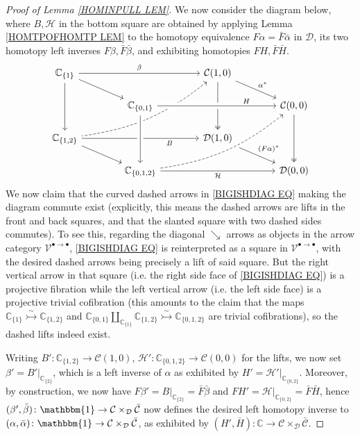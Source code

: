 \documentclass[a4paper,10pt
 ,final
]{article}%
\numberwithin{equation}{section}
\numberwithin{figure}{section}
\theoremstyle{definition} %
\newcommand{\V}{\ensuremath{\mathcal V}}
\newcommand{\1}{\ensuremath{\mathbbm 1}}%
\begin{document}
\begin{proof}[Proof of Lemma \ref{HOMINPULL LEM}]
	We now consider the diagram below, 
	where $B, \mathcal{H}$ in the bottom square
	are obtained by applying Lemma \ref{HOMTPOFHOMTP LEM}
	to the homotopy equivalence 
	$F\alpha = \bar{F} \bar{\alpha}$ in $\mathcal{D}$,
	its two homotopy left inverses
	$F\beta, \bar{F} \bar{\beta}$,
	and exhibiting homotopies
	$F H, \bar{F} \bar{H}$.
	\begin{equation}\label{BIGISHDIAG EQ}
	\begin{tikzcd}[row sep = 15pt,column sep = 40pt]
	\mathbb{C}_{\{1\}} 	\ar{rr}{\beta} \ar{rd} \ar{dd}&&
	\mathcal{C}(1,0) \ar[twoheadrightarrow]{dd} \ar{dr}{\alpha^{\**}}
	\ar[dashed,leftarrow,bend left =15]{ddll}
	\\
	&
	\mathbb{C}_{\{0,1\}} \arrow[crossing over]{rr}[near end]{H} &&
	\mathcal{C}(0,0)  
	\ar[twoheadrightarrow]{dd}
	\\
	\mathbb{C}_{\{1,2\}} \ar{rr}[swap,near end]{B} \ar{rd} &&
	\mathcal{D}(1,0) \ar{rd}{(F\alpha)^{\**}}
	\\
	&
	\mathbb{C}_{\{0,1,2\}}
	\ar[dashed,bend right =15,crossing over]{uurr}
	\ar{rr}[swap]{\mathcal{H}} \arrow[uu, leftarrow, crossing over] &&
	\mathcal{D}(0,0)
	\end{tikzcd}
	\end{equation}
	We now claim that the curved dashed arrows in 
	\eqref{BIGISHDIAG EQ}
	making the diagram commute exist
	(explicitly, this means the dashed arrows are lifts in the front and back squares, and that the slanted square with two dashed sides commutes).
	To see this, regarding the diagonal $\searrow$ arrows as objects in the arrow category $\V^{\bullet \to \bullet}$, 
	\eqref{BIGISHDIAG EQ}
	is reinterpreted as a square in $\V^{\bullet \to \bullet}$,
	with the desired dashed arrows being precisely a lift of said square.
	But the right vertical arrow in that square
	(i.e. the right side face of \eqref{BIGISHDIAG EQ}) is a projective fibration 
	while the left vertical arrow 
	(i.e. the left side face)
	is a projective trivial cofibration
	(this amounts to the claim that the maps
	$\mathbb{C}_{\{1\}} \overset{\sim}{\rightarrowtail} \mathbb{C}_{\{1,2\}}$ and
	$\mathbb{C}_{\{0,1\}} \amalg_{\mathbb{C}_{\{1\}}} \mathbb{C}_{\{1,2\}} \overset{\sim}{\rightarrowtail} \mathbb{C}_{\{0,1,2\}}$
	are trivial cofibrations),
	so the dashed lifts indeed exist.
	
	Writing 
	$B'\colon \mathbb{C}_{\{1,2\}} \to \mathcal{C}(1,0)$,
	$\mathcal{H}' \colon \mathbb{C}_{\{0,1,2\}} \to \mathcal{C}(0,0)$
	for the lifts,
	we now set
	$\beta' = B'|_{\mathbb{C}_{\{2\}}}$,
	which is a left inverse of $\alpha$
	as exhibited by $H' = \mathcal{H}'|_{\mathbb{C}_{\{0,2\}}}$.
	Moreover, by construction, we now have
	$F\beta' = B|_{\mathbb{C}_{\{2\}}} = \bar{F} \bar{\beta}$
	and 
	$FH' = \mathcal{H}|_{\mathbb{C}_{\{0,2\}}} = \bar{F} \bar{H}$,
	hence
	$(\beta',\bar{\beta})\colon \mathbbm{1} \to
	\mathcal{C} \times_{\mathcal{D}}\bar{\mathcal{C}}$
	now defines the desired left homotopy inverse to 
	$(\alpha,\bar{\alpha}) \colon \mathbbm{1} \to
	\mathcal{C} \times_{\mathcal{D}}\bar{\mathcal{C}}$,
	as exhibited by
	$(H',\bar{H}) \colon \mathbb{C} \to
	\mathcal{C} \times_{\mathcal{D}}\bar{\mathcal{C}}$.
\end{proof}






{}

\end{document}
